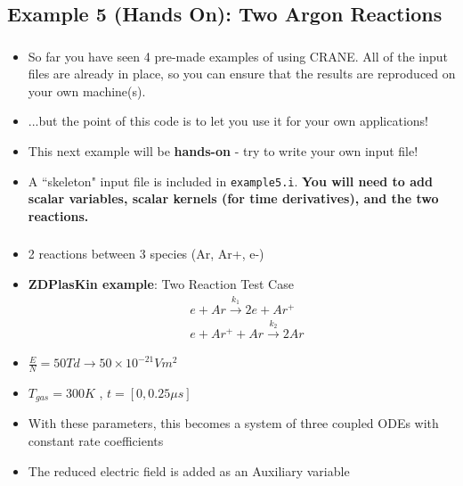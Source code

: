 \subsection{Example 5 (Hands On): Two Argon Reactions}

\begin{frame}[fragile]
	\frametitle{\insertsubsectionhead}
	\begin{itemize}
		\item So far you have seen 4 pre-made examples of using CRANE. All of the input files are already in place, so you can ensure that the results are reproduced on your own machine(s).
		\item ...but the point of this code is to let you use it for your own applications!
		\item This next example will be \textbf{hands-on} - try to write your own input file!
		\item A ``skeleton" input file is included in \texttt{example5.i}. \textbf{You will need to add scalar variables, scalar kernels (for time derivatives), and the two reactions.}
	\end{itemize}
\end{frame}

\begin{frame}[fragile]
	\frametitle{\insertsubsectionhead}
	\begin{itemize}
		\item 2 reactions between 3 species (Ar, Ar+, e-)
		\item \textbf{ZDPlasKin example}\footnotemark: Two Reaction Test Case 
		\begin{align*}
			&e + Ar \xrightarrow{k_1} 2e + Ar^+  \\
			&e + Ar^+ + Ar \xrightarrow{k_2} 2Ar  
		\end{align*}
		\item $\tfrac{E}{N} = 50 Td \rightarrow 50\times 10^{-21} V m^2$
		\item $T_{gas} = 300 K$ , $t=[0,0.25 \mu s]$
		\item With these parameters, this becomes a system of three coupled ODEs with constant rate coefficients
		\item The reduced electric field is added as an Auxiliary variable

	\end{itemize}
\end{frame}

